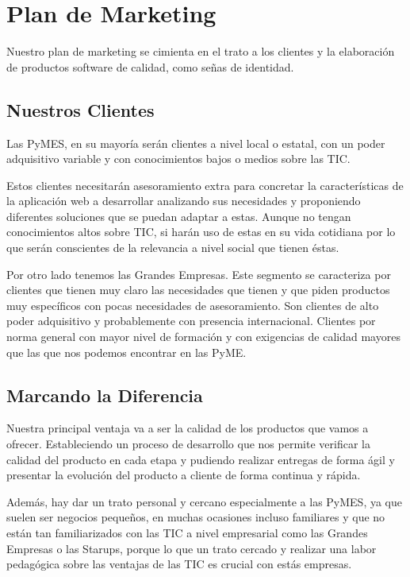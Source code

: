 \section{Plan de Marketing}
Nuestro plan de marketing se cimienta en el trato a los clientes y la elaboración de productos software de calidad, como señas de identidad.

\subsection{Nuestros Clientes}
Las PyMES, en su mayoría serán clientes a nivel local o estatal, con un poder adquisitivo variable y con conocimientos bajos o medios sobre las TIC.

Estos clientes necesitarán asesoramiento extra para concretar la características de la aplicación web a desarrollar analizando sus necesidades y proponiendo diferentes soluciones que se puedan adaptar a estas. Aunque no tengan conocimientos altos sobre TIC, si harán uso de estas en su vida cotidiana por lo que serán conscientes de la relevancia a nivel social que tienen éstas.

Por otro lado tenemos las Grandes Empresas. Este segmento se caracteriza por clientes que tienen muy claro las necesidades que tienen y que piden productos muy específicos con pocas necesidades de asesoramiento. Son clientes de alto poder adquisitivo y probablemente con presencia internacional. Clientes por norma general con mayor nivel de formación y con exigencias de calidad mayores que las que nos podemos encontrar en las PyME.

\subsection{Marcando la Diferencia}
Nuestra principal ventaja va a ser la calidad de los productos que vamos a ofrecer. Estableciendo un proceso de desarrollo que nos permite verificar la calidad del producto en cada etapa y pudiendo realizar entregas de forma ágil y presentar la evolución del producto a cliente de forma continua y rápida.

Además, hay dar un trato personal y cercano especialmente a las PyMES, ya que suelen ser negocios pequeños, en muchas ocasiones incluso familiares y que no están tan familiarizados con las TIC a nivel empresarial como las Grandes Empresas o las Starups, porque lo que un trato cercado y realizar una labor pedagógica sobre las ventajas de las TIC es crucial con estás empresas.

